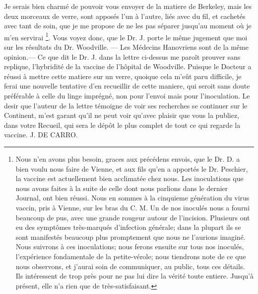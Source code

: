 Je serais bien charmé de pouvoir vous envoyer de la matiere de Berkeley, mais les deux morceaux de verre, sont apposés l'un à l'autre, liés avec du fil, et cachetés avec tant de soin, que je me propose de ne les pas séparer jusqu'au moment où je m'en servirai \footnote{Nous n'en avons plus besoin, graces aux précédens envois, que le Dr. D. a bien voulu nous faire de Vienne, et aux fils qu'en a apportés le Dr. Peschier, la vaccine est actuellement bien acclimatée chez nous. Les inoculations que nous avons faites à la suite de celle dont nous parlions dans le dernier Journal, ont bien réussi. Nous en sommes à la cinquieme génération du virus vaccin, pris à Vienne, sur les bras du C. M. Un de nos inoculés nous a fourni beaucoup de pus, avec une grande rougeur autour de l'incision. Plusieurs ont eu des symptômes très-marqués d'infection générale; dans la plupart ils se sont manifestés beaucoup plus promptement que nous ne l'aurions imaginé. Nous suivrons à ces inoculations; nous ferons ensuite sur tous nos inoculés, l'expérience fondamentale de la petite-vérole; nous tiendrons note de ce que nous observons, et j'aurai soin de communiquer, au public, tous ces détails. Ils intéressent de trop près pour ne pas lui dire la vérité toute entiere. Jusqu'à présent, elle n'a rien que de très-satisfaisant.}.
\setcounter{page}{193}
Vous voyez donc, que le Dr. J. porte le même jugement que moi sur les résultats du Dr. Woodville. — Les Médecins Hanovriens sont de la même opinion.— Ce que dit le Dr. J. dans la lettre ci-dessus me paroît prouver sans replique, l'hybridité de la vaccine de l'hôpital de Woodville.
Puisque le Docteur a réussi à mettre cette matiere sur un verre, quoique cela m'eût paru difficile, je ferai une nouvelle tentative d'en recueillir de cette maniere, qui seroit sans doute préférable à celle du linge imprégné, non pour l'envoi mais pour l'inoculation.
Le desir que l'auteur de la lettre témoigne de voir ses recherches se continuer sur le Continent, m'est garant qu'il ne peut voir qu'avec plaisir que vous la publiez, dans votre Recueil, qui sera le dépôt le plus complet de tout ce qui regarde la vaccine.
J. DE CARRO.
